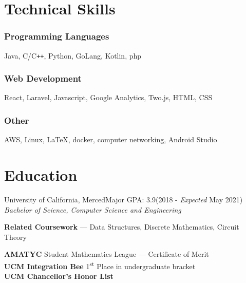 \documentclass[letterpaper,12pt]{article}
\begin{document}
\section{Technical Skills}
    \subsubsection{Programming Languages}
    Java, C/C\verb!++!, Python, GoLang, Kotlin, php
    \vspace*{-4mm}
    \subsubsection{Web Development}
    React, Laravel, Javascript, Google Analytics, Two.js, HTML, CSS
    \vspace*{-4mm}
    \subsubsection{Other}
    AWS, Linux, \LaTeX, docker, computer networking, Android Studio
    \vspace*{-4mm}
\section{Education}
    University of California, Merced\null\hfill Major GPA: 3.9\quad (2018 - \emph{Expected} May 2021)\\
    \emph{Bachelor of Science, Computer Science and Engineering}
    \begin{center}
        \textbf{Related Coursework} --- Data Structures, Discrete Mathematics, Circuit Theory
    \end{center}
    \textbf{AMATYC} Student Mathematics League --- Certificate of Merit\\
    \textbf{UCM Integration Bee} 1\textsuperscript{st} Place in undergraduate bracket\\
    \textbf{UCM Chancellor's Honor List}
\end{document}
